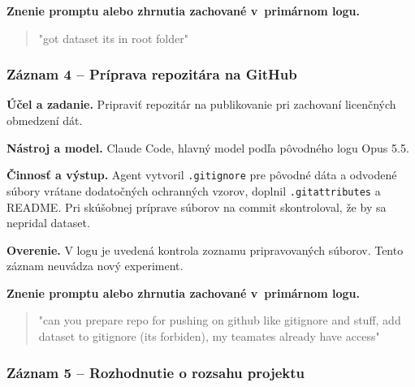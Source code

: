 \par\noindent\textbf{Znenie promptu alebo zhrnutia zachované v~primárnom logu.}

\begin{quote}\normalsize "got dataset its in root folder"\end{quote}

\subsubsection*{Záznam 4 -- Príprava repozitára na GitHub}


\par\noindent \textbf{Účel a zadanie.} Pripraviť repozitár na publikovanie pri zachovaní licenčných obmedzení dát.\par\smallskip
\par\noindent \textbf{Nástroj a model.} Claude Code, hlavný model podľa pôvodného logu Opus 5.5.\par\smallskip
\par\noindent \textbf{Činnosť a výstup.} Agent vytvoril \texttt{.\allowbreak{}gitignore} pre pôvodné dáta a odvodené súbory vrátane dodatočných ochranných vzorov, doplnil \texttt{.\allowbreak{}gitattribute\allowbreak{}s} a README. Pri skúšobnej príprave súborov na commit skontroloval, že by sa nepridal dataset.\par\smallskip
\par\noindent \textbf{Overenie.} V logu je uvedená kontrola zoznamu pripravovaných súborov. Tento záznam neuvádza nový experiment.\par\smallskip

\par\noindent\textbf{Znenie promptu alebo zhrnutia zachované v~primárnom logu.}

\begin{quote}\normalsize "can you prepare repo for pushing on github like gitignore and stuff, add dataset to gitignore (its forbiden), my teamates already have access"\end{quote}

\subsubsection*{Záznam 5 -- Rozhodnutie o rozsahu projektu}


